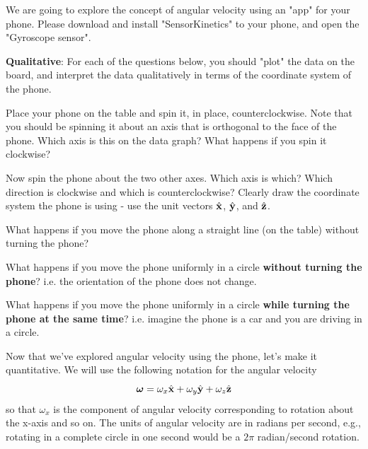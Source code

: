 \documentclass{tufte-handout}
\begin{document}
We are going to explore the concept of angular velocity using an "app" for your phone. Please download and install "SensorKinetics" to your phone, and open the "Gyroscope sensor". 
\be[resume=exercises, label=\textbf{Exercise} (\arabic*)]
\item {\bf Qualitative}: For each of the questions below, you should "plot" the data on the board, and interpret the data qualitatively in terms of the coordinate system of the phone.
\be
\item Place your phone on the table and spin it, in place, counterclockwise. Note that you should be spinning it about an axis that is orthogonal to the face of the phone. Which axis is this on the data graph? What happens if you spin it clockwise?
\item Now spin the phone about the two other axes. Which axis is which? Which direction is clockwise and which is counterclockwise? Clearly draw the coordinate system the phone is using - use the unit vectors $\hat{\mathbf{x}}$, $\hat{\mathbf{y}}$, and $\hat{\mathbf{z}}$. 
\item What happens if you move the phone along a straight line (on the table) without turning the phone?
\item What happens if you move the phone uniformly in a circle {\bf without turning the phone}? i.e. the orientation of the phone does not change.
\item What happens if you move the phone uniformly in a circle {\bf while turning the phone at the same time}? i.e. imagine the phone is a car and you are driving in a circle.
\ee
\ee

Now that we've explored angular velocity using the phone, let's make it quantitative. We will use the following notation for the angular velocity
\[ \boldsymbol \omega = \omega_x \hat{\mathbf{x}} + \omega_y \hat{\mathbf{y}} + \omega_z \hat{\mathbf{z}} \]
so that $\omega_x$ is the component of angular velocity corresponding to rotation about the x-axis and so on. The units of angular velocity are in radians per second, e.g., rotating in a complete circle in one second would be a $2 \pi$ radian/second rotation.
\end{document}
